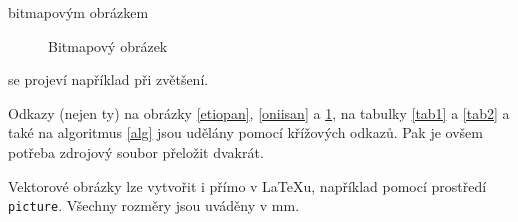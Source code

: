 \documentclass[a4paper,11pt]{article}
\begin{document}
 bitmapovým obrázkem

\begin{figure}[h]
\centering
{}
\caption{Bitmapový obrázek}
\label{oniisan2}
\end{figure}
\bigskip

\noindent se projeví například při zvětšení.
\par Odkazy (nejen ty) na obrázky \ref{etiopan}, \ref{oniisan} a \ref{oniisan2}, na tabulky \ref{tab1} a \ref{tab2} a také na algoritmus \ref{alg} jsou udělány pomocí křížových odkazů. Pak je ovšem potřeba zdrojový soubor přeložit dvakrát.
\par Vektorové obrázky lze vytvořit i přímo v \LaTeX u, například pomocí prostředí \verb|picture|. Všechny rozměry jsou uváděny v mm.

\pagebreak
\end{document}
